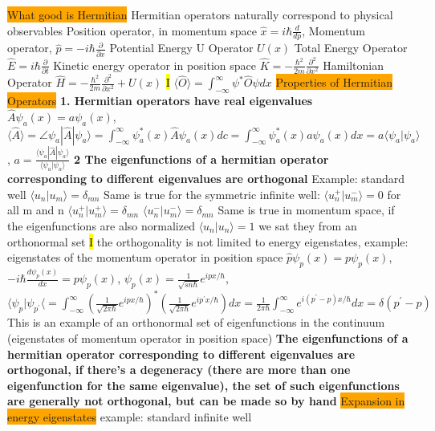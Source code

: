 \documentclass[fontsize=4pt]{scrartcl}
\begin{document}
\colorbox{Orange}{What good is Hermitian}
Hermitian operators naturally correspond to physical observables
Position operator, in momentum space $\hat{x} = i\hbar \frac{d}{dp}$,
Momentum operator,  $\hat{p} = -i\hbar \frac{\partial}{\partial x}$
Potential Energy U  Operator $U(x)$
Total Energy Operator $\hat{E} = i\hbar\frac{\partial}{\partial t}$
Kinetic energy operator in position space $\hat{K} = - \frac{\hbar^2}{2m}\frac{\partial^2}{\partial x^2}$
Hamiltonian Operator $\hat{H} = -\frac{\hbar^2}{2m}\frac{\partial^2}{\partial x^2}+U(x)$
\hl{I}
$\langle \hat{O} \rangle = \int_{-\infty}^{\infty} \psi^* \hat{O} \psi dx$
\colorbox{Orange}{Properties of Hermitian Operators}
\textbf{1. Hermitian operators have real eigenvalues}
$\hat{A}\psi_a (x) = a\psi_a (x)$,
$\langle \hat{A} \rangle = \angle \psi_a | \hat{A} | \psi_a \rangle = \int_{-\infty}^{\infty} \psi^*_a (x) \hat{A} \psi _a (x) dc = \int_{-\infty}^{\infty} \psi_a^* (x) a \psi_a (x) dx = a \langle \psi_a | \psi_a \rangle$,
$a = \frac{\langle \psi_a | \hat{A} | \psi_a \rangle}{\langle \psi_a | \psi_a \rangle}$
\textbf{2 The eigenfunctions of a hermitian operator corresponding to different eigenvalues are orthogonal}
Example: standard well $\langle u_n | u_m \rangle = \delta_{mn}$
Same is true for the symmetric infinite well:
$\langle u_n^+ | u_m^- \rangle = 0$ for all m and n
$\langle u_n^+ | u_m^+ \rangle = \delta_{mn}$ 
$\langle u_n^- | u_m^- \rangle = \delta_{mn}$ 
Same is true in momentum space, if the eigenfunctions are also normalized $\langle u_n | u_n \rangle =1$ we sat they from an orthonormal set
\hl{I}
the orthogonality is not limited to energy eigenstates, example: eigenstates of the momentum operator in position space
$\hat{p}\psi_p (x) = p\psi_p (x)$,
$-i\hbar \frac{d\psi_p (x)}{dx} = p\psi_p (x)$,
$\psi_p(x) = \frac{1}{\sqrt{sn\hbar}}e^{ipx/\hbar}$,
$\langle \psi_p | \psi_{p^{\prime}} \langle = \int_{-\infty}^{\infty} (\frac{1}{\sqrt{2\pi \hbar}}e^{ipx/\hbar})^{*}(\frac{1}{\sqrt{2 \pi \hbar}}e^{ip^{\prime}x/\hbar})dx = \frac{1}{2\pi \hbar} \int_{-\infty}^{\infty} e^{i(p^{\prime}-p)x/\hbar}dx = \delta(p^{\prime} - p)$
This is an example of an orthonormal set of eigenfunctions in the continuum (eigenstates of momentum operator in position space)
\textbf{The eigenfunctions of a hermitian operator corresponding to different eigenvalues are orthogonal, if there's a degeneracy (there are more than one eigenfunction for the same eigenvalue), the set of such eigenfunctions are generally not orthogonal, but can be made so by hand}
\colorbox{Orange}{Expansion in energy eigenstates}
example: standard infinite well
\end{document}
